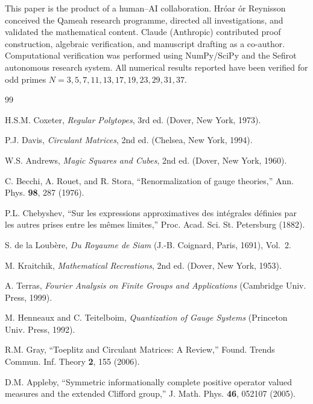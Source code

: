 \documentclass[aip,jmp,reprint,superscriptaddress,floatfix,nofootinbib]{revtex4-2}
\theoremstyle{definition}
\theoremstyle{remark}
\begin{document}
\begin{acknowledgments}
This paper is the product of a human--AI collaboration.
Hr\'oar \TH\'or Reynisson conceived the Qameah research programme,
directed all investigations, and validated the mathematical content.
Claude (Anthropic) contributed proof construction, algebraic verification,
and manuscript drafting as a co-author.
Computational verification was performed using NumPy/SciPy
and the Sefirot autonomous research system.
All numerical results reported have been verified for odd primes
$N = 3, 5, 7, 11, 13, 17, 19, 23, 29, 31, 37$.
\end{acknowledgments}

\begin{thebibliography}{99}

 H.S.M. Coxeter, \textit{Regular Polytopes}, 3rd ed.
(Dover, New York, 1973).

 P.J. Davis, \textit{Circulant Matrices}, 2nd ed.
(Chelsea, New York, 1994).

 W.S. Andrews, \textit{Magic Squares and Cubes},
2nd ed. (Dover, New York, 1960).

 C. Becchi, A. Rouet, and R. Stora, ``Renormalization of
gauge theories,'' Ann. Phys. \textbf{98}, 287 (1976).

 P.L. Chebyshev, ``Sur les expressions approximatives
des int\'egrales d\'efinies par les autres prises entre les m\^emes
limites,'' Proc. Acad. Sci. St. Petersburg (1882).

 S. de la Loub\`ere, \textit{Du Royaume de Siam}
(J.-B. Coignard, Paris, 1691), Vol.~2.

 M. Kraitchik, \textit{Mathematical Recreations},
2nd ed. (Dover, New York, 1953).

 A. Terras, \textit{Fourier Analysis on Finite Groups
and Applications} (Cambridge Univ. Press, 1999).

 M. Henneaux and C. Teitelboim, \textit{Quantization
of Gauge Systems} (Princeton Univ. Press, 1992).

 R.M. Gray, ``Toeplitz and Circulant Matrices: A Review,''
Found. Trends Commun. Inf. Theory \textbf{2}, 155 (2006).

 D.M. Appleby, ``Symmetric informationally complete
positive operator valued measures and the extended Clifford group,''
J. Math. Phys. \textbf{46}, 052107 (2005).


\end{thebibliography}
\end{document}
